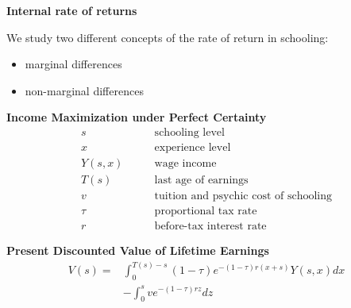 \begin{frame}\begin{center}
\LARGE\textbf{Internal rate of returns}
\end{center}\end{frame}
\begin{frame}
We study two different concepts of the rate of return in schooling:

\vspace{0.3cm}
\begin{itemize}\setlength\itemsep{1em}
\item marginal differences
\item non-marginal differences
\end{itemize}

\end{frame}
\begin{frame}
\textbf{Income Maximization under Perfect Certainty \nocite{Rosen.1977,Willis.1979}}
\begin{align*}
s               &\qquad\text{schooling level} \\
x               &\qquad\text{experience level} \\
Y(s, x)         &\qquad\text{wage income} \\
T(s)            &\qquad\text{last age of earnings} \\
v               &\qquad\text{tuition and psychic cost of schooling} \\
\tau            &\qquad\text{proportional tax rate} \\
r               &\qquad\text{before-tax interest rate}
\end{align*}
\end{frame}
\begin{frame}
\textbf{Present Discounted Value of Lifetime Earnings}
\begin{align*}
V(s) = & \int_0^{T(s) - s} (1 - \tau) e^{-(1 - \tau)r(x + s)} Y(s,x) dx \\
       & - \int^s_0 ve^{-(1 - \tau)rz}dz
\end{align*}
\end{frame}
